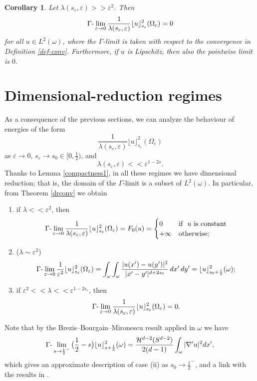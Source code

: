 \documentclass[11pt]{article}
\newtheorem{corollary}[definition]{Corollary}
\def\e{\varepsilon}
\begin{document}
\begin{corollary} 
Let $\lambda(s_\e, \e)>\!> \e^2$. Then 
$$\Gamma\hbox{\rm-}\lim_{\e\to 0}\frac{1}{\lambda(s_\e,\e)}\lfloor u\rfloor_{s_\e}^2(\Omega_\e)=0$$ 
for all $u\in L^{2}(\omega)$, where the $\Gamma$-limit is taken with respect to the convergence in Definition {\rm\ref{def-conv}}. Furthermore, 
if $u$ is Lipschitz, then also the pointwise limit is $0$. 
\end{corollary}


\section{Dimensional-reduction regimes} 
As a consequence of the previous sections, we can analyze the behaviour of energies of the form $$\frac{1}{\lambda(s_\e,\e)}\lfloor u\rfloor_{s_\e}^2(\Omega_\e)$$ 
as $\e\to 0$, $s_\e\to s_0\in [0,\frac{1}{2})$, and $$\lambda(s_\e,\e)<\!<\e^{1-2s}.$$
Thanks to Lemma \ref{compactness1}, in all these regimes we have dimensional reduction; that is, the domain of the $\Gamma$-limit is a subset of $L^2(\omega)$. 
In particular, from Theorem \ref{drconv} we obtain 
\begin{enumerate}
\item[(i)] if $\lambda<\!<\e^2$, then 
$$\Gamma\hbox{\rm-}\lim_{\e\to 0}\frac{1}{\lambda(s_\e,\e)}\lfloor u\rfloor_{s_\e}^2(\Omega_\e)=F_0(u)=\begin{cases} 
0 & \hbox{\rm if }\ u \ \hbox{\rm is constant}\\
+\infty & \hbox{\rm otherwise; }
\end{cases}$$   
\item[(ii)] ($\lambda\sim\e^2$) 
$$\Gamma\hbox{\rm-}\lim_{\e\to 0}\frac{1}{\e^2}\lfloor u\rfloor_{s_\e}^2(\Omega_\e)=\int_\omega\int_\omega 
\frac{|u(x')-u(y')|^2}{|x'-y'|^{d+2s_0}}\, dx^\prime \, dy^\prime=\lfloor u\rfloor_{s_0+\frac12}^2(\omega);$$ 
\item[(iii)] if $\e^2<\!<\lambda<\!<\e^{1-2s_\e}$, then 
$$\Gamma\hbox{\rm-}\lim_{\e\to 0}\frac{1}{\lambda(s_\e,\e)}\lfloor u\rfloor_{s_\e}^2(\Omega_\e)=0.
$$  
\end{enumerate}

Note that by the Brezis--Bourgain--Mironescu result applied in $\omega$ we have 
$$
\Gamma\hbox{\rm-}\lim_{s\to \frac12^-}
\big(\frac12-s\big)\lfloor u\rfloor_{s+\frac12}^2(\omega)=
\frac{\mathcal H^{d-2}(S^{d-2})}{2(d-1)}\int_\omega |\nabla'u|^2dx',
$$
which gives an approximate description of case (ii) as $s_0\to\frac12^-$, and a link with the results in \cite{BS25}.
\end{document}
